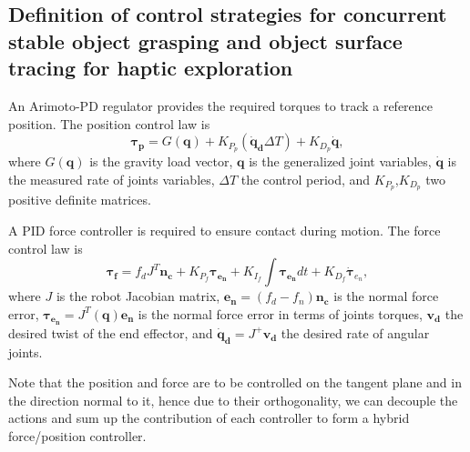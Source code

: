 
\subsection{Definition of control strategies for concurrent stable object grasping and object surface tracing for haptic exploration}
\label{sec:start}

An Arimoto-PD regulator provides the required torques to track a reference position. The position control law is
\begin{equation}
    \bm{\tau_p} = G(\bm{q}) + K_{P_p} \left(\bm{\dot{q}_d}\Delta T\right) + K_{D_p}\bm{\dot{q}},
\end{equation}
where $G(\bm{q})$ is the gravity load vector, $\bm{{q}}$  is the generalized joint variables, $\bm{\dot{q}}$ is the measured rate of joints variables, $\Delta T$ the control period, and $K_{P_p}$,$K_{D_p}$ two positive definite matrices.


A PID force controller is required to ensure contact during motion. The force control law is
\begin{equation}
    \bm{\tau_f} = f_dJ^T\bm{n_c} + K_{P_f}\bm{\tau_{e_n}} + K_{I_f}\int\bm{\tau_{e_n}}dt + K_{D_f}\dot{\bm{\tau}}_{e_n},
\end{equation}
where $J$ is the robot Jacobian matrix, $\bm{e_n} = (f_d - f_n)\bm{n_c}$ is the normal force error, $\bm{\tau_{e_n}} = J^T(\bm{q})\bm{e_n}$ is the normal force error in terms of joints torques, $\bm{v_d}$ the desired twist of the end effector, and $\bm{\dot{q}_d} = J^+\bm{v_d}$ the desired rate of angular joints.

Note that the position and force are to be controlled on the tangent plane and in the direction normal to it, hence due to their orthogonality, we can decouple the actions and sum up the contribution of each controller to form a hybrid force/position controller.

